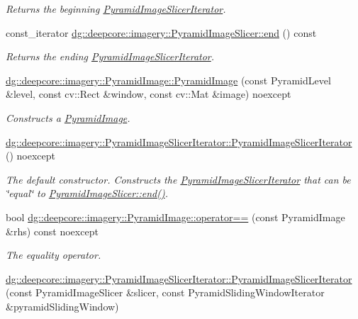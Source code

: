 \begin{DoxyCompactItemize}
\begin{DoxyCompactList}\small\item\em Returns the beginning \hyperlink{classdg_1_1deepcore_1_1imagery_1_1_pyramid_image_slicer_iterator}{Pyramid\+Image\+Slicer\+Iterator}. \end{DoxyCompactList}\item 
const\+\_\+iterator \hyperlink{group___imagery_module_ga6956abd01339df9e8c60963702ce3543}{dg\+::deepcore\+::imagery\+::\+Pyramid\+Image\+Slicer\+::end} () const 
\begin{DoxyCompactList}\small\item\em Returns the ending \hyperlink{classdg_1_1deepcore_1_1imagery_1_1_pyramid_image_slicer_iterator}{Pyramid\+Image\+Slicer\+Iterator}. \end{DoxyCompactList}\item 
\hyperlink{group___imagery_module_gaf984c16fb13cf715c6948a5754e49030}{dg\+::deepcore\+::imagery\+::\+Pyramid\+Image\+::\+Pyramid\+Image} (const Pyramid\+Level \&level, const cv\+::\+Rect \&window, const cv\+::\+Mat \&image) noexcept
\begin{DoxyCompactList}\small\item\em Constructs a \hyperlink{structdg_1_1deepcore_1_1imagery_1_1_pyramid_image}{Pyramid\+Image}. \end{DoxyCompactList}\item 
\hyperlink{group___imagery_module_gab8b3f9886530d00229870234b0457e5a}{dg\+::deepcore\+::imagery\+::\+Pyramid\+Image\+Slicer\+Iterator\+::\+Pyramid\+Image\+Slicer\+Iterator} () noexcept
\begin{DoxyCompactList}\small\item\em The default constructor. Constructs the \hyperlink{classdg_1_1deepcore_1_1imagery_1_1_pyramid_image_slicer_iterator}{Pyramid\+Image\+Slicer\+Iterator} that can be \char`\"{}equal\char`\"{} to \hyperlink{group___imagery_module_ga6956abd01339df9e8c60963702ce3543}{Pyramid\+Image\+Slicer\+::end()}. \end{DoxyCompactList}\item 
bool \hyperlink{group___imagery_module_ga584d04224a994c7b1acef73a43fb531a}{dg\+::deepcore\+::imagery\+::\+Pyramid\+Image\+::operator==} (const Pyramid\+Image \&rhs) const noexcept
\begin{DoxyCompactList}\small\item\em The equality operator. \end{DoxyCompactList}\item 
\hyperlink{group___imagery_module_gae2892ba870dde12cc9fe000bd8ef35b4}{dg\+::deepcore\+::imagery\+::\+Pyramid\+Image\+Slicer\+Iterator\+::\+Pyramid\+Image\+Slicer\+Iterator} (const Pyramid\+Image\+Slicer \&slicer, const Pyramid\+Sliding\+Window\+Iterator \&pyramid\+Sliding\+Window)

\end{DoxyCompactItemize}
